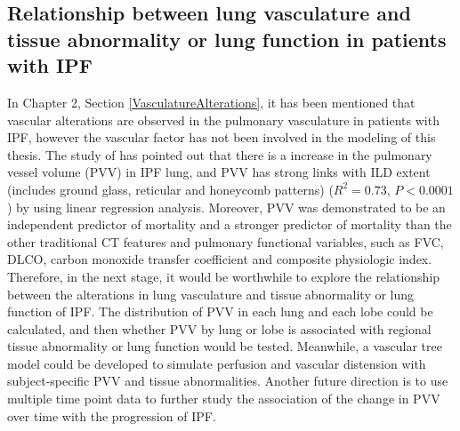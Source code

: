 \subsection{Relationship between lung vasculature and tissue abnormality or lung function in patients with IPF}
In Chapter 2, Section \ref{VasculatureAlterations}, it has been mentioned that vascular alterations are observed in the pulmonary vasculature in patients with IPF, however the vascular factor has not been involved in the modeling of this thesis. The study of \cite{Jacob2016Evaluation,Jacob2016Mortality} has pointed out that there is a increase in the pulmonary vessel volume (PVV) in IPF lung, and PVV has strong links with ILD extent (includes ground glass, reticular and honeycomb patterns) ($R^2 = 0.73$, $P < 0.0001$) by using linear regression analysis. Moreover, PVV was demonstrated to be an independent predictor of mortality and a stronger predictor of mortality than the other traditional CT features and pulmonary functional variables, such as FVC, DLCO, carbon monoxide transfer coefficient and composite physiologic index. Therefore, in the next stage, it would be worthwhile to explore the relationship between the alterations in lung vasculature and tissue abnormality or lung function of IPF. The distribution of PVV in each lung and each lobe could be calculated, and then whether PVV by lung or lobe is associated with regional tissue abnormality or lung function would be tested. Meanwhile, a vascular tree model could be developed to simulate perfusion and vascular distension with subject-specific PVV and tissue abnormalities. Another future direction is to use multiple time point data to further study the association of the change in PVV over time with the progression of IPF.
